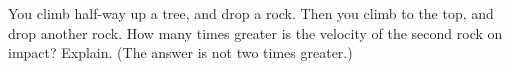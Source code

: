 You climb half-way up a tree, and drop a rock. Then you
climb to the top, and drop another rock. How many times
greater is the velocity of the second rock on impact?
Explain. (The answer is not two times greater.)
